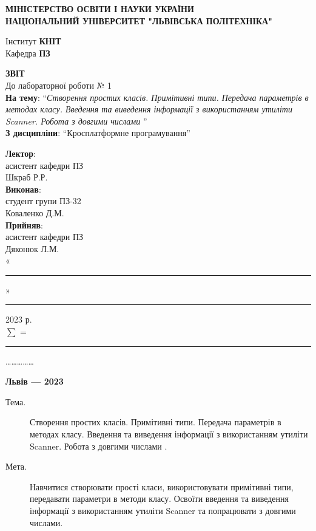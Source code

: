 \documentclass[14pt]{extreport}
\newcommand\subject{Кросплатформне програмування}
\newcommand\lecturer{асистент кафедри ПЗ\\Шкраб Р.Р.}
\newcommand\teacher{асистент кафедри ПЗ\\Дяконюк Л.М.}
\newcommand\mygroup{ПЗ-32}
\newcommand\lab{1}
\newcommand\theme{Створення простих класів. Примітивні типи. Передача параметрів
	в методах класу. Введення та виведення інформації з використанням
	утиліти Scanner. Робота з довгими числами
}
\newcommand\purpose{Навчитися створювати прості класи, використовувати примітивні типи, передавати параметри в методи класу. Освоїти введення та виведення інформації з використанням утиліти Scanner та попрацювати з довгими числами}
\begin{document}
\begin{normalsize}
	\begin{titlepage}
		\thispagestyle{empty}
		\begin{center}
			\textbf{МІНІСТЕРСТВО ОСВІТИ І НАУКИ УКРАЇНИ\\
				НАЦІОНАЛЬНИЙ УНІВЕРСИТЕТ "ЛЬВІВСЬКА ПОЛІТЕХНІКА"}
		\end{center}
		\begin{flushright}
			Інститут \textbf{КНІТ}\\
			Кафедра \textbf{ПЗ}
		\end{flushright}
		\vspace{200pt}
		\begin{center}
			\textbf{ЗВІТ}\\
			\vspace{10pt}
			До лабораторної роботи № \lab\\
			\textbf{На тему}: “\textit{\theme}”\\
			\textbf{З дисципліни}: “\subject”
		\end{center}
		\vspace{40pt}
		\begin{flushright}
			
			\textbf{Лектор}:\\
			\lecturer\\
			\vspace{10pt}
			\textbf{Виконав}:\\
			
			студент групи \mygroup\\
			Коваленко Д.М.\\
			\vspace{10pt}
			\textbf{Прийняв}:\\
			
			\teacher\\
			
			\vspace{28pt}
			«\rule{1cm}{0.15mm}» \rule{1.5cm}{0.15mm} 2023 р.\\
			$\sum$ = \rule{1cm}{0.15mm}……………\\
			
		\end{flushright}
		\vspace{\fill}
		\begin{center}
			\textbf{Львів — 2023}
		\end{center}
	\end{titlepage}
		
	\begin{description}
		\item[Тема.] \theme.
		\item[Мета.] \purpose.
	\end{description}


\end{normalsize}
\end{document}
